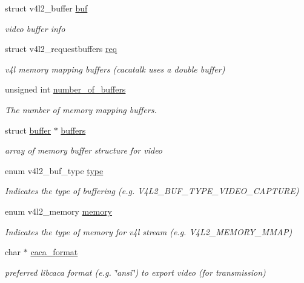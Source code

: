 \begin{DoxyCompactItemize}
struct v4l2\-\_\-buffer \hyperlink{structvideo__params__s_ac6db9e27abcbbf76acd19e7eb0b946b2}{buf}
\begin{DoxyCompactList}\small\item\em video buffer info \end{DoxyCompactList}\item 
struct v4l2\-\_\-requestbuffers \hyperlink{structvideo__params__s_a2688c600ca2c6aa4cd2e87cca2fa7909}{req}
\begin{DoxyCompactList}\small\item\em v4l memory mapping buffers (cacatalk uses a double buffer) \end{DoxyCompactList}\item 
unsigned int \hyperlink{structvideo__params__s_a61f9d75862499eb015a76c40c58abbd3}{number\-\_\-of\-\_\-buffers}
\begin{DoxyCompactList}\small\item\em \-The number of memory mapping buffers. \end{DoxyCompactList}\item 
struct \hyperlink{structbuffer}{buffer} $\ast$ \hyperlink{structvideo__params__s_af22e9e81ce6b788b4357d70f43dc1260}{buffers}
\begin{DoxyCompactList}\small\item\em array of memory buffer structure for video \end{DoxyCompactList}\item 
enum v4l2\-\_\-buf\-\_\-type \hyperlink{structvideo__params__s_a0bf1de534c89c2e3fd2c0785cd3684c0}{type}
\begin{DoxyCompactList}\small\item\em \-Indicates the type of buffering (e.\-g. \-V4\-L2\-\_\-\-B\-U\-F\-\_\-\-T\-Y\-P\-E\-\_\-\-V\-I\-D\-E\-O\-\_\-\-C\-A\-P\-T\-U\-R\-E) \end{DoxyCompactList}\item 
enum v4l2\-\_\-memory \hyperlink{structvideo__params__s_ac54e2e0bd136b84eff239a49a8b11afa}{memory}
\begin{DoxyCompactList}\small\item\em \-Indicates the type of memory for v4l stream (e.\-g. \-V4\-L2\-\_\-\-M\-E\-M\-O\-R\-Y\-\_\-\-M\-M\-A\-P) \end{DoxyCompactList}\item 
char $\ast$ \hyperlink{structvideo__params__s_ab7b86e346f34ccf37397dfd3e6a21128}{caca\-\_\-format}
\begin{DoxyCompactList}\small\item\em preferred libcaca format (e.\-g. \char`\"{}ansi\char`\"{}) to export video (for transmission) \end{DoxyCompactList}\item 

\end{DoxyCompactItemize}
